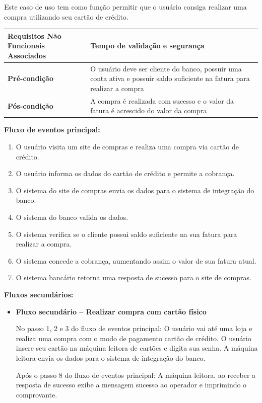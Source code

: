 Este caso de uso tem como função permitir que o usuário consiga realizar uma compra utilizando seu cartão de crédito.

\begin{table}[h]
  \centering
  \begin{tabular}{|p{4cm} | p{10cm} |}
      \hline
      \small{\textbf{Requisitos Não Funcionais Associados}}	&	Tempo de validação e segurança	\\ \hline
      \small{\textbf{Pré-condição}}	&	O usuário deve ser cliente do banco, possuir uma conta ativa e possuir saldo suficiente na fatura para realizar a compra	\\ \hline
      \small{\textbf{Pós-condição}}	&	A compra é realizada com sucesso e o valor da fatura é acrescido do valor da compra	\\ \hline
    \end{tabular}
\end{table}

\textbf{Fluxo de eventos principal:}

\begin{enumerate}
  \item O usuário visita um site de compras e realiza uma compra via cartão de crédito.
  \item O usuário informa os dados do cartão de crédito e permite a cobrança.
  \item O sistema do site de compras envia os dados para o sistema de integração do banco.
  \item O sistema do banco valida os dados.
  \item O sistema verifica se o cliente possui saldo suficiente na sua fatura para realizar a compra.
  \item O sistema concede a cobrança, aumentando assim o valor de sua fatura atual.
  \item O sistema bancário retorna uma resposta de sucesso para o site de compras.
\end{enumerate}

\textbf{Fluxos secundários:}

\begin{itemize}
  \item \textbf{Fluxo secundário – Realizar compra com cartão físico}

  No passo 1, 2 e 3 do fluxo de eventos principal:
  \subitem O usuário vai até uma loja e realiza uma compra com o modo de pagamento cartão de crédito.
  \subitem O usuário insere seu cartão na máquina leitora de cartões e digita sua senha.
  \subitem A máquina leitora envia os dados para o sistema de integração do banco.

  Após o passo 8 do fluxo de eventos principal:
  \subitem A máquina leitora, ao receber a resposta de sucesso exibe a mensagem sucesso ao operador e imprimindo o comprovante.


\end{itemize}


